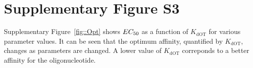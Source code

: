 \documentclass[a4paper,11pt]{article}
\newcommand{\EC}{EC_{\rm{50}}}
\newcommand{\KdOT}{K_{\mathrm{dOT}}}
\begin{document}
\section{Supplementary Figure S3}
Supplementary Figure~\ref{fig::Opt} shows $\EC$ as a function of $\KdOT$ for various parameter values. It can be seen that the optimum affinity, quantified by $\KdOT$, changes as parameters are changed. A lower value of $\KdOT$ correponds to a better affinity for the oligonucleotide.
%  
% 
%  
\end{document}
